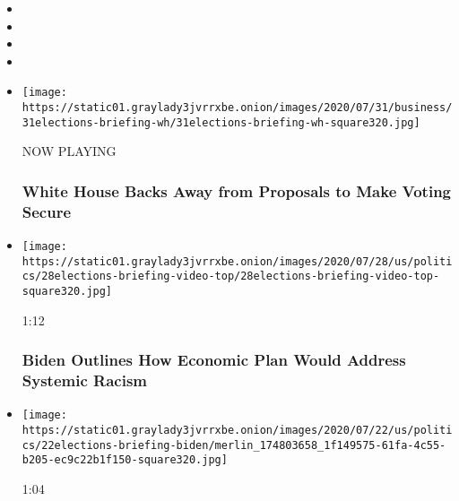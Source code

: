 \begin{itemize}
\item
\item
\item
\item
\end{itemize}

\begin{itemize}
\item
  \texttt{[image: https://static01.graylady3jvrrxbe.onion/images/2020/07/31/business/31elections-briefing-wh/31elections-briefing-wh-square320.jpg]}

  NOW PLAYING

  \hypertarget{white-house-backs-away-from-proposals-to-make-voting-secure-2}{%
  \subsubsection{White House Backs Away from Proposals to Make Voting
  Secure}\label{white-house-backs-away-from-proposals-to-make-voting-secure-2}}
\item
  \href{https://www.nytimes3xbfgragh.onion/video/us/politics/100000007260487/watch-live-biden-delivers-speech-on-systemic-racism.html?action=click\&module=video-series-bar\&region=header\&pgtype=Article\&playlistId=video/2020-Elections}{}

  \texttt{[image: https://static01.graylady3jvrrxbe.onion/images/2020/07/28/us/politics/28elections-briefing-video-top/28elections-briefing-video-top-square320.jpg]}

  1:12

  \hypertarget{biden-outlines-how-economic-plan-would-address-systemic-racism}{%
  \subsubsection{Biden Outlines How Economic Plan Would Address Systemic
  Racism}\label{biden-outlines-how-economic-plan-would-address-systemic-racism}}
\item
  \href{https://www.nytimes3xbfgragh.onion/video/us/100000007251300/biden-trump-racist-divide-america.html?action=click\&module=video-series-bar\&region=header\&pgtype=Article\&playlistId=video/2020-Elections}{}

  \texttt{[image: https://static01.graylady3jvrrxbe.onion/images/2020/07/22/us/politics/22elections-briefing-biden/merlin\_174803658\_1f149575-61fa-4c55-b205-ec9c22b1f150-square320.jpg]}

  1:04


\end{itemize}
